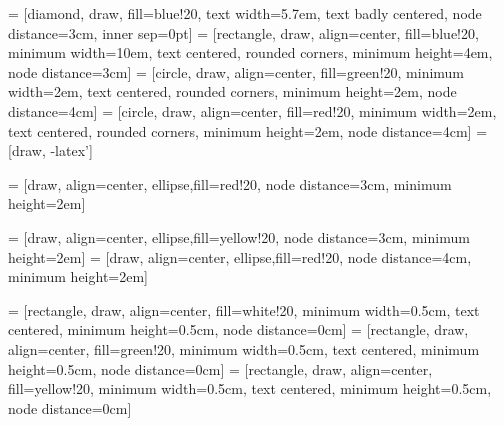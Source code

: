  = [diamond, draw, fill=blue!20, 
    text width=5.7em, text badly centered, node distance=3cm, inner sep=0pt]
 = [rectangle, draw, align=center, fill=blue!20, minimum width=10em,
	text centered, rounded corners, minimum height=4em, node distance=3cm]
 = [circle, draw, align=center, fill=green!20, minimum width=2em,
	text centered, rounded corners, minimum height=2em, node distance=4cm]
 = [circle, draw, align=center, fill=red!20, minimum width=2em,
	text centered, rounded corners, minimum height=2em, node distance=4cm]
 = [draw, -latex']

 = [draw, align=center, ellipse,fill=red!20, node distance=3cm,
    minimum height=2em]
    
 = [draw, align=center, ellipse,fill=yellow!20, node distance=3cm,
    minimum height=2em]
 = [draw, align=center, ellipse,fill=red!20, node distance=4cm,
    minimum height=2em]

 = [rectangle, draw, align=center, fill=white!20, minimum width=0.5cm,
	text centered, minimum height=0.5cm, node distance=0cm]
 = [rectangle, draw, align=center, fill=green!20, minimum width=0.5cm,
	text centered, minimum height=0.5cm, node distance=0cm]
 = [rectangle, draw, align=center, fill=yellow!20, minimum width=0.5cm,
	text centered, minimum height=0.5cm, node distance=0cm]